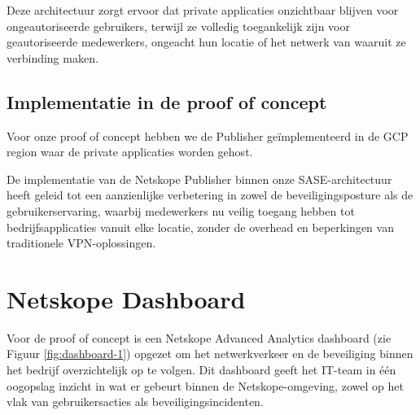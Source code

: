 Deze architectuur zorgt ervoor dat private applicaties onzichtbaar blijven voor ongeautoriseerde gebruikers, terwijl ze volledig toegankelijk zijn voor geautoriseerde medewerkers, ongeacht hun locatie of het netwerk van waaruit ze verbinding maken.

\subsection{Implementatie in de proof of concept}

Voor onze proof of concept hebben we de Publisher geïmplementeerd in de GCP region waar de private applicaties worden gehost.

\vspace{2ex}

De implementatie van de Netskope Publisher binnen onze SASE-architectuur heeft geleid tot een aanzienlijke verbetering in zowel de beveiligingsposture als de gebruikerservaring, waarbij medewerkers nu veilig toegang hebben tot bedrijfsapplicaties vanuit elke locatie, zonder de overhead en beperkingen van traditionele VPN-oplossingen.

\section{Netskope Dashboard}
Voor de proof of concept is een Netskope Advanced Analytics dashboard (zie Figuur \ref{fig:dashboard-1}) opgezet om het netwerkverkeer en de beveiliging binnen het bedrijf overzichtelijk op te volgen. Dit dashboard geeft het IT-team in één oogopslag inzicht in wat er gebeurt binnen de Netskope-omgeving, zowel op het vlak van gebruikersacties als beveiligingsincidenten.

